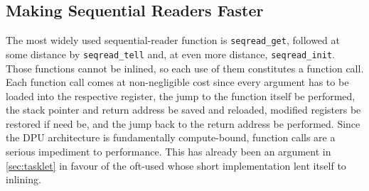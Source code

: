 \subsection{Making Sequential Readers Faster}
\label{sec:mram:merge:faster}



The most widely used sequential-reader function is \lstinline|seqread_get|, followed at some distance by \lstinline|seqread_tell| and, at even more distance, \lstinline|seqread_init|.
Those functions cannot be inlined, so each use of them constitutes a function call.
Each function call comes at non-negligible cost since every argument has to be loaded into the respective register, the jump to the function itself be performed, the stack pointer and return address be saved and reloaded, modified registers be restored if need be, and the jump back to the return address be performed.
Since the DPU architecture is fundamentally compute-bound, function calls are a serious impediment to performance.
This has already been an argument in \cref{sec:tasklet} in favour of the oft-used \IS{} whose short implementation lent itself to inlining.

